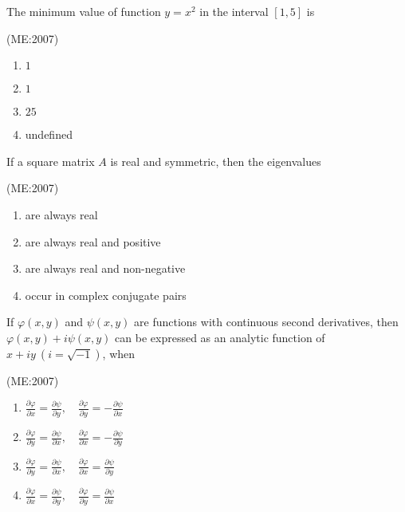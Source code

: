 \iffalse
\title{ME:2007}
\author{AI24BTECH11007}
\section{me}
\chapter{2007}
\fi

\item The minimum value of function $y = x^2$ in the interval $[1,5]$ is

	\hfill{(ME:2007)}
\begin{multicols}{4}
\begin{enumerate}
    \item $1$
    \item $1$
    \item $25$
    \item undefined
\end{enumerate}
\end{multicols}

\item If a square matrix $A$ is real and symmetric, then the eigenvalues

	\hfill{(ME:2007)}

\begin{multicols}{2}
\begin{enumerate}
    \item are always real
    \item are always real and positive
    \item are always real and non-negative
    \item occur in complex conjugate pairs
\end{enumerate}
\end{multicols}

\item If $\varphi(x,y)$ and $\psi(x,y)$ are functions with continuous second derivatives, then $\varphi(x,y) + i \psi(x,y)$ can be expressed as an analytic function of $x + iy \ (i = \sqrt{-1})$, when

	\hfill{(ME:2007)}

\begin{multicols}{2}
\begin{enumerate}
    \item $\frac{\partial \varphi}{\partial x} = \frac{\partial \psi}{\partial y}, \quad \frac{\partial \varphi}{\partial y} = -\frac{\partial \psi}{\partial x}$
    \item $\frac{\partial \varphi}{\partial y} = \frac{\partial \psi}{\partial x}, \quad \frac{\partial \varphi}{\partial x} = -\frac{\partial \psi}{\partial y}$
    \item $\frac{\partial \varphi}{\partial y} = \frac{\partial \psi}{\partial x}, \quad \frac{\partial \varphi}{\partial x} = \frac{\partial \psi}{\partial y}$
    \item $\frac{\partial \varphi}{\partial x} = \frac{\partial \psi}{\partial y}, \quad \frac{\partial \varphi}{\partial y} = \frac{\partial \psi}{\partial x}$
\end{enumerate}
\end{multicols}

